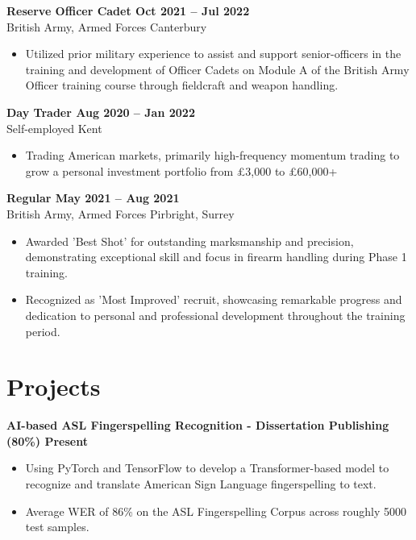 \documentclass[11pt,letterpaper]{article}
\begin{document}
\textbf{Reserve Officer Cadet \hfill Oct 2021 -- Jul 2022}\\
British Army, Armed Forces \hfill Canterbury\\
\vspace{-10pt}
\begin{itemize}
  \item Utilized prior military experience to assist and support senior-officers in the training and development of Officer Cadets on Module A of the British Army Officer training course through fieldcraft and weapon handling.
\end{itemize}

\textbf{Day Trader \hfill Aug 2020 -- Jan 2022 } \\
Self-employed \hfill Kent\\
\vspace{-10pt}
\begin{itemize}
  \item Trading American markets, primarily high-frequency momentum trading to grow a personal investment portfolio from £3,000 to £60,000+
\end{itemize}

\textbf{Regular \hfill May 2021 -- Aug 2021}\\
British Army, Armed Forces \hfill Pirbright, Surrey\\
\vspace{-10pt}
\begin{itemize}
  \item Awarded 'Best Shot' for outstanding marksmanship and precision, demonstrating exceptional skill and focus in firearm handling during Phase 1 training.
  \item Recognized as 'Most Improved' recruit, showcasing remarkable progress and dedication to personal and professional development throughout the training period.
\end{itemize}

\vspace{-16.5pt}

\section*{Projects}
\textbf{AI-based ASL Fingerspelling Recognition - Dissertation Publishing (80\%) \hfill Present} \\
\vspace{-10pt}
\begin{itemize}
  \item Using PyTorch and TensorFlow to develop a Transformer-based model to recognize and translate American Sign Language fingerspelling to text.
  \item Average WER of 86\% on the ASL Fingerspelling Corpus across roughly 5000 test samples.
\end{itemize}
\end{document}
